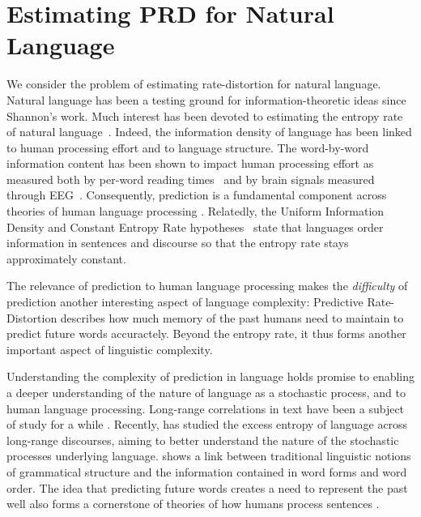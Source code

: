 \documentclass[entropy,article,submit,moreauthors,pdftex,10pt,a4paper]{Definitions/mdpi}
\begin{document}
\section{Estimating PRD for Natural Language}\label{sec:language}

We consider the problem of estimating rate-distortion for natural language.
Natural language has been a testing ground for information-theoretic ideas since Shannon's work.
Much interest has been devoted to estimating the entropy rate of natural language~\citep{shannon1951prediction,takahira2016entropy,bentz2017entropy,takahashi2018cross}.
Indeed, the information density of language has been linked to human processing effort and to language structure.
The word-by-word information content has been shown to impact human processing effort as measured both by per-word reading times~\citep{hale-probabilistic-2001,levy-expectation-based-2008,smith-effect-2013} and by brain signals measured through EEG~\citep{DBLP:conf/acl/FrankOGV13, kuperberg2016we}.
Consequently, prediction is a fundamental component across theories of human language processing  \citep{kuperberg2016we}.
Relatedly, the Uniform Information Density and Constant Entropy Rate hypotheses~\citep{fenk1980konstanz,genzel2002entropy,jaeger2007speakers} state that languages order information in sentences and discourse so that the entropy rate stays approximately constant. %

The relevance of prediction to human language processing makes the \emph{difficulty} of prediction another interesting aspect of language complexity:
Predictive Rate-Distortion describes how much memory of the past humans need to maintain to predict future words accuractely.
Beyond the entropy rate, it thus forms another important aspect of linguistic complexity.


Understanding the complexity of prediction in language holds promise to enabling a deeper understanding of the nature of language as a stochastic process, and to human language processing.
Long-range correlations in text have been a subject of study for a while \citep{schenkel1993long,ebeling1994entropy,ebeling1995long,altmann2012origin,yang2016long,chen2018quantifying}.
Recently, \citet{dkebowski2018natural} has studied the excess entropy of language across long-range discourses, aiming to better understand the nature of the stochastic processes underlying language.
\citet{koplenig2017statistical} shows a link between traditional linguistic notions of grammatical structure and the information contained in word forms and word order.
The idea that predicting future words creates a need to represent the past well also forms a cornerstone of theories of how humans process sentences \citep{gibson-linguistic-1998,futrell-noisy-context-2017}.
\end{document}
